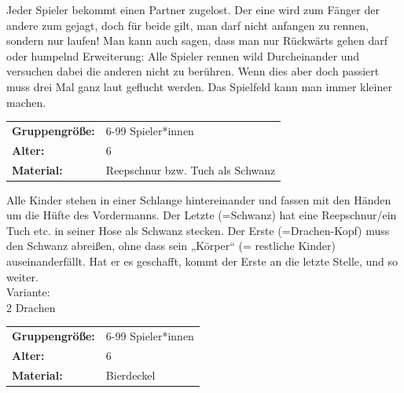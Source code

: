  Jeder Spieler bekommt einen Partner zugelost.  Der eine wird zum Fänger der andere zum gejagt, doch für beide gilt, man darf nicht anfangen zu rennen, sondern nur laufen! Man kann auch sagen, dass man nur Rückwärts gehen darf oder humpelnd Erweiterung: Alle Spieler rennen wild Durcheinander und versuchen dabei die anderen nicht zu berühren. Wenn dies aber doch passiert muss drei Mal ganz laut geflucht werden. Das Spielfeld kann man immer kleiner machen. \\



\begin{table}[H]
\begin{tabular}{>{\bfseries}lp{8cm}}
   Gruppengröße:   & 6-99 Spieler*innen\\
    Alter: & 6 \\
    Material: & Reepschnur bzw. Tuch als Schwanz \\
\end{tabular}
\end{table} 

Alle Kinder stehen in einer Schlange hintereinander und fassen mit den Händen um die Hüfte des Vordermanns. Der Letzte (=Schwanz) hat eine Reepschnur/ein Tuch etc. in seiner Hose als Schwanz stecken. Der Erste (=Drachen-Kopf) muss den Schwanz abreißen, ohne dass sein „Körper“ (= restliche Kinder) auseinanderfällt. Hat er es geschafft, kommt der Erste an die letzte Stelle, und so weiter.
 \\ \newline
 Variante: \\ 2 Drachen\\



\begin{table}[H]
\begin{tabular}{>{\bfseries}lp{8cm}}
   Gruppengröße:   & 6-99 Spieler*innen\\
    Alter: & 6 \\
    Material: & Bierdeckel \\
\end{tabular}
\end{table} 


